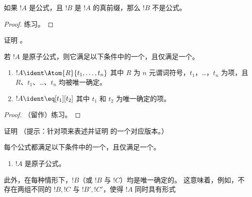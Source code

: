 \documentclass[../../../include/open-logic-section]{subfiles}
\begin{document}
\begin{lem}
如果 $!A$ 是公式，且 $!B$ 是 $!A$ 的真前缀，那么 $!B$ 不是公式。
\end{lem}

\begin{proof}
练习。
\end{proof}

\begin{prob}
证明 。
\end{prob}

\begin{prop}
若 $!A$ 是原子公式，则它满足以下条件中的一个，且仅满足一个。
\begin{enumerate}
\item $!A \ident \Atom{R}{t_1,\dots,t_n}$ 其中 $R$ 为 $n$ 元谓词符号，$t_1$，\dots，$t_n$ 为项，且 $R$、$t_1$、\dots、$t_n$ 均被唯一确定。
\item $!A \ident \eq[t_1][t_2]$ 其中 $t_1$ 和 $t_2$ 为唯一确定的项。
\end{enumerate}
\end{prop}

\begin{proof}
（留作）练习。
\end{proof}

\begin{prob}
证明 （提示：针对项来表述并证明  的一个对应版本。）
\end{prob}

\begin{prop}[唯一可读性]
每个公式都满足以下条件中的一个，且仅满足一个。
\begin{enumerate}
\item $!A$ 是原子公式。







\end{enumerate}
此外，在每种情形下，$!B$（或 $!B$ 与 $!C$）均是唯一确定的。
这意味着，例如，不存在两组不同的 $!B, !C$ 与 $!B', !C'$，使得 $!A$ 同时具有形式
\end{prop}
\end{document}
